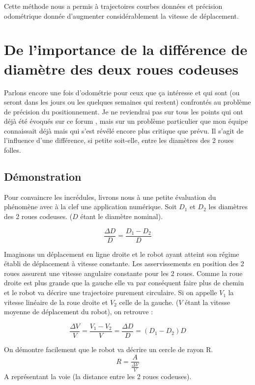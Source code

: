 \documentclass[a4paper]{report}
\begin{document}
Cette méthode nous a permis à trajectoires courbes données et précision odométrique donnée d'augmenter considérablement la vitesse de déplacement.

\chapter{De l'importance de la différence de diamètre des deux roues codeuses}
Parlons encore une fois d’odométrie pour ceux que ça intéresse et qui sont (ou seront dans les jours ou les quelques semaines qui restent) confrontés au problème de précision du positionnement.
Je ne reviendrai pas sur tous les points qui ont déjà été évoqués sur ce forum , mais sur un problème particulier que mon équipe connaissait déjà mais qui s’est révélé encore plus critique que prévu. Il s’agit de l’influence d’une différence, si petite soit-elle, entre les diamètres des 2 roues folles.

\section{Démonstration}
Pour convaincre les incrédules, livrons nous à une petite évaluation du phénomène avec à la clef une application numérique.
Soit $D_1$ et $D_2$ les diamètres des 2 roues codeuses. ($D$ étant le diamètre nominal).

\begin{equation}
\frac{\Delta D}{D} = \frac{D_1-D_2}{D}
\end{equation}

Imaginons un déplacement en ligne droite et le robot ayant atteint son régime établi de déplacement à vitesse constante.
Les asservissements en position des 2 roues assurent une vitesse angulaire constante pour les 2 roues. Comme la roue droite est plus grande que la gauche elle va par conséquent faire plus de chemin et le robot va décrire une trajectoire purement circulaire. 
Si on appelle $V_1$ la vitesse linéaire de la roue droite et $V_2$ celle de la gauche.
($V$ étant la vitesse moyenne de déplacement du robot), on retrouve :

\begin{equation}
\frac{\Delta V}{V} = \frac{V_1-V_2}{V} = \frac{\Delta D}{D} = (D_1-D_2)D
\end{equation}

On démontre facilement que le robot va décrire un cercle de rayon R.
\begin{equation}
R= \frac{A}{\frac{\Delta V}{V}}
\end{equation}
A représentant la voie (la distance entre les 2 roues codeuses).
\end{document}
